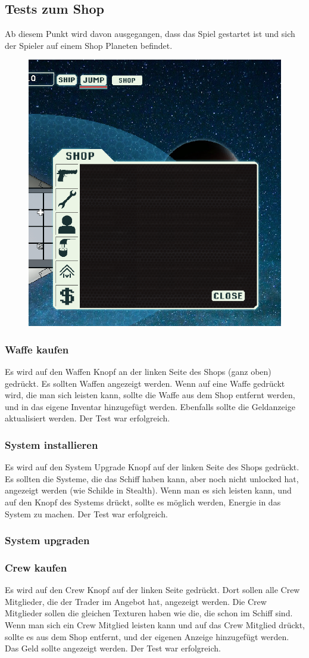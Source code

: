 \documentclass[fontsize=12pt,paper=a4,twoside]{scrartcl}
\begin{document}
\subsection{Tests zum Shop}
Ab diesem Punkt wird davon ausgegangen, dass das Spiel gestartet ist und sich der Spieler auf einem Shop Planeten befindet. \\
\begin{figure}[h!]
\centering
\includegraphics[width=0.5\linewidth]{images/shop.png}
\end{figure}
\subsubsection{Waffe kaufen}
Es wird auf den Waffen Knopf an der linken Seite des Shops (ganz oben) gedrückt. Es sollten Waffen angezeigt werden. Wenn auf eine Waffe gedrückt wird, die man sich leisten kann, sollte die Waffe aus dem Shop entfernt werden, und in das eigene Inventar hinzugefügt werden. Ebenfalls sollte die Geldanzeige aktualisiert werden.  Der Test war erfolgreich. \\
\subsubsection{System installieren}
Es wird auf den System Upgrade Knopf auf der linken Seite des Shops gedrückt. Es sollten die Systeme, die das Schiff haben kann, aber noch nicht unlocked hat, angezeigt werden (wie Schilde in Stealth). Wenn man es sich leisten kann, und auf den Knopf des Systems drückt, sollte es möglich werden, Energie in das System zu machen.  Der Test war erfolgreich. \\ 
\subsubsection{System upgraden}
\subsubsection{Crew kaufen}
Es wird auf den Crew Knopf auf der linken Seite gedrückt. Dort sollen alle Crew Mitglieder, die der Trader im Angebot hat, angezeigt werden. Die Crew Mitglieder sollen die gleichen Texturen haben wie die, die schon im Schiff sind. Wenn man sich ein Crew Mitglied leisten kann und auf das Crew Mitglied drückt, sollte es aus dem Shop entfernt, und der eigenen Anzeige hinzugefügt werden. Das Geld sollte angezeigt werden.  Der Test war erfolgreich. \\
\end{document}
